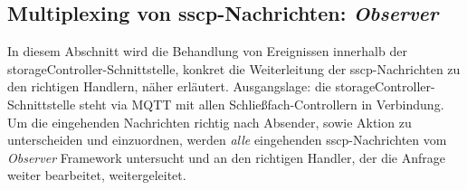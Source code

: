 \subsection{Multiplexing von \acrshort{sscp}-Nachrichten: \textit{Observer}}\label{sec:impl:multiplexing}
In diesem Abschnitt wird die Behandlung von Ereignissen innerhalb der \gls{storageController}-Schnittstelle, konkret die Weiterleitung der \acrshort{sscp}-Nachrichten zu den richtigen Handlern, näher erläutert. Ausgangslage: die \gls{storageController}-Schnittstelle steht via MQTT mit allen Schließfach-Controllern in Verbindung. Um die eingehenden Nachrichten richtig nach Absender, sowie Aktion zu unterscheiden und einzuordnen, werden \textit{alle} eingehenden \acrshort{sscp}-Nachrichten vom \textit{Observer} Framework untersucht und an den richtigen Handler, der die Anfrage weiter bearbeitet, weitergeleitet.\bigskip

